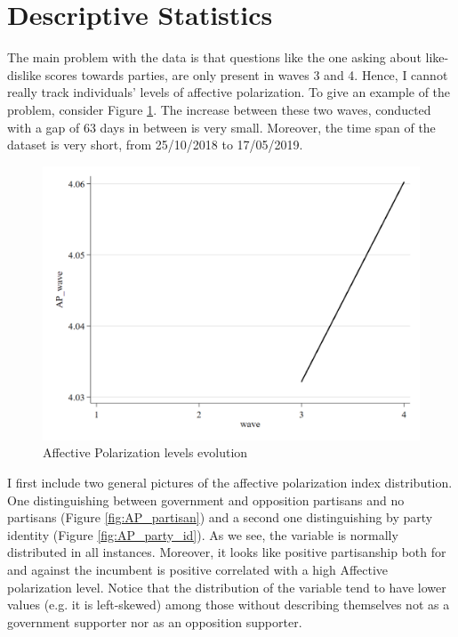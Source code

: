 \documentclass[a4paper, svgnames]{article}
\begin{document}
\section{Descriptive Statistics}
\label{section:descriptive}

The main problem with the data is that questions like the one asking about like-dislike scores towards parties, are only present in waves 3 and 4. Hence, I cannot really track individuals' levels of affective polarization. To give an example of the problem, consider Figure \ref*{fig:AP_evolution}. The increase between these two waves, conducted with a gap of 63 days in between is very small. Moreover, the time span of the dataset is very short, from 25/10/2018 to 17/05/2019.

\begin{figure}[H]
	\centering
	\includegraphics[scale=0.35]{Figures/increase_in_AP.png}
	\caption{\label{fig:AP_evolution} Affective Polarization levels evolution}
\end{figure}

I first include two general pictures of the affective polarization index distribution. One distinguishing between government and opposition partisans and no partisans (Figure \ref*{fig:AP_partisan}) and a second one distinguishing by party identity (Figure \ref*{fig:AP_party_id}). As we see, the variable is normally distributed in all instances. Moreover, it looks like positive partisanship both for and against the incumbent is positive correlated with a high Affective polarization level. Notice that the distribution of the variable tend to have lower values (e.g. it is left-skewed) among those without describing themselves not as a government supporter nor as an opposition supporter.
\end{document}
